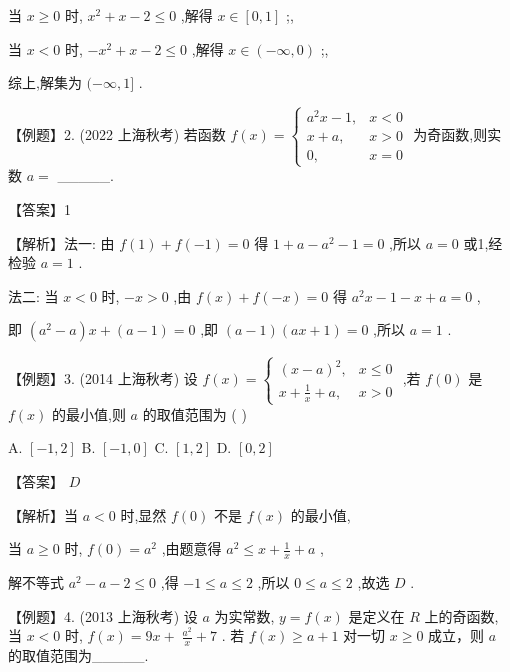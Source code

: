 \documentclass[10pt]{article}
\begin{document}
当 \(x \geq  0\) 时, \({x}^{2} + x - 2 \leq  0\) ,解得 \(x \in  \left\lbrack  {0,1}\right\rbrack\) ;,

当 \(x < 0\) 时, \(- {x}^{2} + x - 2 \leq  0\) ,解得 \(x \in  \left( {-\infty ,0}\right)\) ;,

综上,解集为 \(( - \infty ,1\rbrack\) .

【例题】2. (2022 上海秋考) 若函数 \(f\left( x\right)  = \left\{  \begin{array}{ll} {a}^{2}x - 1, & x < 0 \\  x + a, & x > 0 \\  0, & x = 0 \end{array}\right.\) 为奇函数,则实数 \(a =\) \_\_\_\_\_.

【答案】1

【解析】法一: 由 \(f\left( 1\right)  + f\left( {-1}\right)  = 0\) 得 \(1 + a - {a}^{2} - 1 = 0\) ,所以 \(a = 0\) 或1,经检验 \(a = 1\) .

法二: 当 \(x < 0\) 时, \(- x > 0\) ,由 \(f\left( x\right)  + f\left( {-x}\right)  = 0\) 得 \({a}^{2}x - 1 - x + a = 0\) ,

即 \(\left( {{a}^{2} - a}\right) x + \left( {a - 1}\right)  = 0\) ,即 \(\left( {a - 1}\right) \left( {{ax} + 1}\right)  = 0\) ,所以 \(a = 1\) .

【例题】3. (2014 上海秋考) 设 \(f\left( x\right)  = \left\{  \begin{array}{ll} {\left( x - a\right) }^{2}, & x \leq  0 \\  x + \frac{1}{x} + a, & x > 0 \end{array}\right.\) ,若 \(f\left( 0\right)\) 是 \(f\left( x\right)\) 的最小值,则 \(a\) 的取值范围为 ( )

A. \(\left\lbrack  {-1,2}\right\rbrack\) B. \(\left\lbrack  {-1,0}\right\rbrack\) C. \(\left\lbrack  {1,2}\right\rbrack\) D. \(\left\lbrack  {0,2}\right\rbrack\)

【答案】 \(D\)

【解析】当 \(a < 0\) 时,显然 \(f\left( 0\right)\) 不是 \(f\left( x\right)\) 的最小值,

当 \(a \geq  0\) 时, \(f\left( 0\right)  = {a}^{2}\) ,由题意得 \({a}^{2} \leq  x + \frac{1}{x} + a\) ,

解不等式 \({a}^{2} - a - 2 \leq  0\) ,得 \(- 1 \leq  a \leq  2\) ,所以 \(0 \leq  a \leq  2\) ,故选 \(D\) .

【例题】4. (2013 上海秋考) 设 \(a\) 为实常数, \(y = f\left( x\right)\) 是定义在 \(R\) 上的奇函数,当 \(x < 0\) 时, \(f\left( x\right)  = {9x} + \; \frac{{a}^{2}}{x} + 7\) . 若 \(f\left( x\right)  \geq  a + 1\) 对一切 \(x \geq  0\) 成立，则 \(a\) 的取值范围为\_\_\_\_\_.
\end{document}
